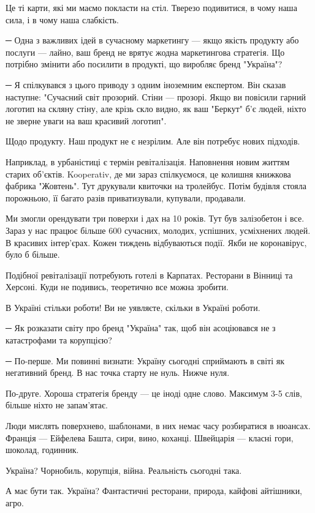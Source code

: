 Це ті карти, які ми маємо покласти на стіл. Тверезо подивитися, в чому наша
сила, і в чому наша слабкість.

─ Одна з важливих ідей в сучасному маркетингу --- якщо якість продукту або
послуги --- лайно, ваш бренд не врятує жодна маркетингова стратегія. Що потрібно
змінити або посилити в продукті, що виробляє бренд "Україна"?

─ Я спілкувався з цього приводу з одним іноземним експертом. Він сказав
наступне: "Сучасний світ прозорий. Стіни --- прозорі. Якщо ви повісили гарний
логотип на скляну стіну, але крізь скло видно, як ваш "Беркут" б’є людей, ніхто
не зверне уваги на ваш красивий логотип".

Щодо продукту. Наш продукт не є незрілим. Але він потребує нових підходів.

Наприклад, в урбаністиці є термін ревіталізація. Наповнення новим життям старих
об’єктів. Kooperativ, де ми зараз спілкуємося, це колишня книжкова фабрика
"Жовтень". Тут друкували квиточки на тролейбус. Потім будівля стояла порожньою,
її багато разів приватизували, купували, продавали. 

Ми змогли орендувати три поверхи і дах на 10 років. Тут був залізобетон і все.
Зараз у нас працює більше 600 сучасних, молодих, успішних, усміхнених людей. В
красивих інтер’єрах. Кожен тиждень відбуваються події. Якби не коронавірус,
було б більше.

Подібної ревіталізації потребують готелі в Карпатах. Ресторани в Вінниці та
Херсоні. Куди не подивись, теоретично все можна зробити.

В Україні стільки роботи! Ви не уявляєте, скільки в Україні роботи. 

─ Як розказати світу про бренд "Україна" так, щоб він асоціювався не з
катастрофами та корупцією?

─ По-перше. Ми повинні визнати: Україну сьогодні сприймають в світі як
негативний бренд. В нас точка старту не нуль. Нижче нуля.

По-друге. Хороша стратегія бренду --- це іноді одне слово. Максимум 3-5 слів,
більше ніхто не запам’ятає.

Люди мислять поверхнево, шаблонами, в них немає часу розбиратися в нюансах.
Франція --- Ейфелева Башта, сири, вино, коханці. Швейцарія --- класні гори,
шоколад, годинник.

Україна? Чорнобиль, корупція, війна. Реальність сьогодні така. 

А має бути так. Україна? Фантастичні ресторани, природа, кайфові айтішники,
агро. 

